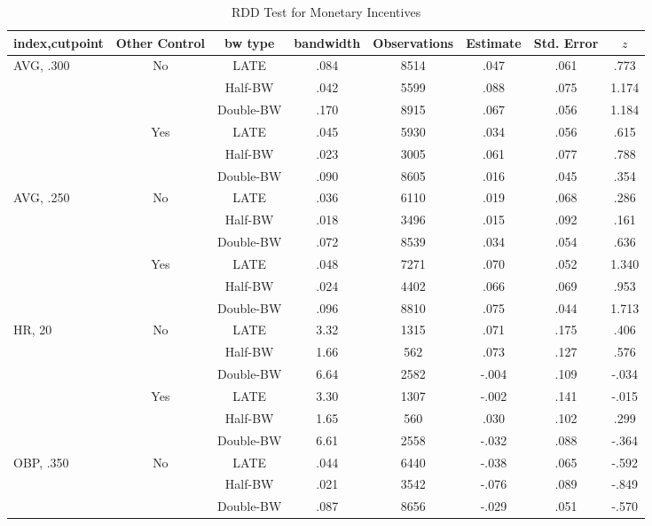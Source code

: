 \documentclass[dvipdfmx,12pt]{beamer}
\begin{document}
\begin{frame}\frametitle{}
  \begin{table}[!]
    \caption{RDD Test for Monetary Incentives}
    \label{RDD_A}
    \tiny
    \centering
    \begin{tabular}{lccccccc}\hline
      index,cutpoint & Other Control & bw type & bandwidth
      & Observations & Estimate & Std. Error & $z$
      \\ \hline \hline
      AVG, .300 & No &LATE & .084 & 8514 & .047 & .061 & .773 \\
      & &Half-BW &  .042 & 5599 & .088 & .075 & 1.174 \\
      & & Double-BW & .170 & 8915  & .067 & .056 & 1.184 \\ \cline{3-8}

      & Yes &LATE & .045 & 5930 & .034 & .056 & .615 \\
      & &Half-BW &  .023 & 3005 & .061 & .077 & .788 \\
      & & Double-BW & .090 & 8605  & .016 & .045 & .354 \\ \hline

      AVG, .250 & No &LATE & .036 & 6110 & .019 & .068 & .286 \\
      & &Half-BW &  .018 & 3496 & .015 & .092 & .161 \\
      & & Double-BW & .072 & 8539  & .034 & .054 & .636 \\ \cline{3-8}

      & Yes &LATE & .048 & 7271 & .070 & .052 & 1.340 \\
      & &Half-BW &  .024 & 4402 & .066 & .069 & .953 \\
      & & Double-BW & .096 & 8810  & .075 & .044 & 1.713 \\ \hline

      HR, 20 & No & LATE & 3.32 & 1315 & .071 & .175 & .406 \\
      & & Half-BW & 1.66 & 562 & .073 & .127 & .576 \\
      & & Double-BW & 6.64 & 2582 & -.004 & .109 & -.034 \\ \cline{3-8}

      & Yes & LATE & 3.30 & 1307 & -.002 & .141 & -.015\\
      & & Half-BW &1.65 & 560 & .030 & .102 & .299 \\
      & & Double-BW & 6.61 & 2558 & -.032 & .088 & -.364 \\ \hline

      OBP, .350 & No &LATE & .044 & 6440 & -.038 & .065 & -.592 \\
      & & Half-BW & .021 & 3542 & -.076 & .089 & -.849 \\
      & & Double-BW & .087 & 8656 & -.029 & .051 & -.570 \\ \cline{3-8}


\end{tabular}
\end{table}
\end{frame}
\end{document}
